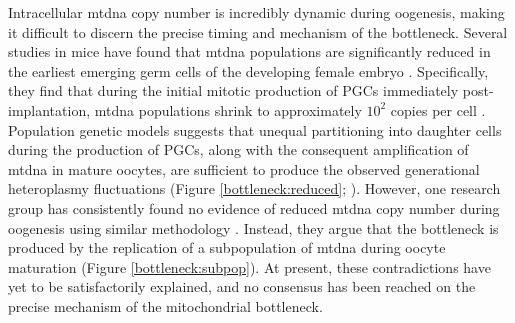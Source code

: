 \documentclass[12pt,twoside]{reedthesis}
\begin{document}
Intracellular \gls{mtdna} copy number is incredibly dynamic during oogenesis, making it difficult to discern the precise timing and mechanism of the bottleneck.
Several studies in mice have found that \gls{mtdna} populations are significantly reduced in the earliest emerging germ cells of the developing female embryo \citep{jenuth_random_1996, shoubridge_mitochondrial_2007, cree_reduction_2008, wai_mitochondrial_2008}.
Specifically, they find that during the initial mitotic production of \gls{PGCs} immediately post-implantation, \gls{mtdna} populations shrink to approximately $10^2$ copies per cell \citep{wai_mitochondrial_2008}. 
Population genetic models suggests that unequal partitioning into daughter cells during the production of \gls{PGCs}, along with the consequent amplification of \gls{mtdna} in mature oocytes, are sufficient to produce the observed generational heteroplasmy fluctuations (Figure \ref{bottleneck:reduced}; \citealp{cree_reduction_2008}). 
However, one research group has consistently found no evidence of reduced \gls{mtdna} copy number during oogenesis using similar methodology \citep{cao_mitochondrial_2007, cao_new_2009}.
Instead, they argue that the bottleneck is produced by the replication of a subpopulation of \gls{mtdna} during oocyte maturation (Figure \ref{bottleneck:subpop}).
At present, these contradictions have yet to be satisfactorily explained, and no consensus has been reached on the precise mechanism of the mitochondrial bottleneck.
\end{document}
